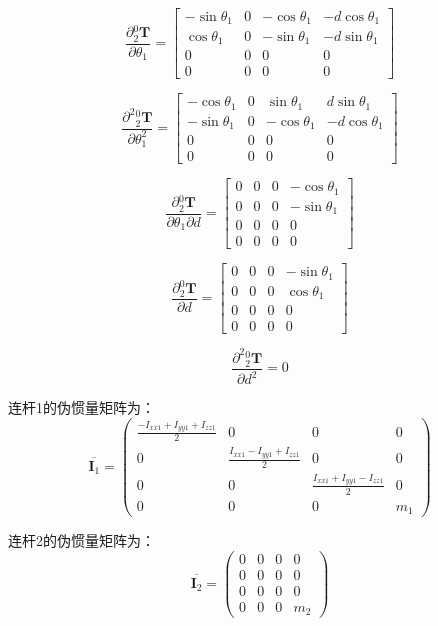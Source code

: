 \documentclass{homework}
\begin{document}
\begin{sol}
\[
  \frac{\partial {_2^0}\mathbf{T}}{\partial \theta_1} =
  \begin{bmatrix}
    -\sin\theta_1 & 0 & -\cos\theta_1 & - d \cos\theta_1 \\
    \cos\theta_1 & 0 & -\sin\theta_1 & - d \sin\theta_1 \\
    0 & 0 & 0 & 0 \\
    0 & 0 & 0 & 0
  \end{bmatrix}
\]

\[
  \frac{\partial^2 {_2^0}\mathbf{T}}{\partial \theta_1^2} =
  \begin{bmatrix}
    -\cos\theta_1 & 0 & \sin\theta_1 & d \sin\theta_1 \\
    -\sin\theta_1 & 0 & -\cos\theta_1 & - d \cos\theta_1 \\
    0 & 0 & 0 & 0 \\
    0 & 0 & 0 & 0
  \end{bmatrix}
\]

\[
  \frac{\partial {_2^0}\mathbf{T}}{\partial \theta_1 \partial d} =
  \begin{bmatrix}
    0 & 0 & 0 & -\cos\theta_1 \\
    0 & 0 & 0 & -\sin\theta_1 \\
    0 & 0 & 0 & 0 \\
    0 & 0 & 0 & 0
  \end{bmatrix}
\]

\[
  \frac{\partial {_2^0}\mathbf{T}}{\partial d} =
  \begin{bmatrix}
    0 & 0 & 0 & -\sin\theta_1 \\
    0 & 0 & 0 & \cos\theta_1 \\
    0 & 0 & 0 & 0 \\
    0 & 0 & 0 & 0
  \end{bmatrix}
\]

\[
  \frac{\partial^2 {_2^0}\mathbf{T}}{\partial d^2} = 0
\]

连杆1的伪惯量矩阵为：
\[
  \overline{\mathbf{I}_1} = 
  \begin{pmatrix}
    \frac{- I_{xx1} + I_{yy1} + I_{zz1}}{2} & 0 & 0 & 0 \\
    0 & \frac{I_{xx1} - I_{yy1} + I_{zz1}}{2} & 0 & 0 \\
    0 & 0 & \frac{I_{xx1} + I_{yy1} - I_{zz1}}{2} & 0 \\
    0 & 0 & 0 & m_1
  \end{pmatrix}
\]

连杆2的伪惯量矩阵为：
\[
  \overline{\mathbf{I}_2} = 
  \begin{pmatrix}
    0 & 0 & 0 & 0 \\
    0 & 0 & 0 & 0 \\
    0 & 0 & 0 & 0 \\
    0 & 0 & 0 & m_2 
  \end{pmatrix}
\]


\end{sol}
\end{document}
